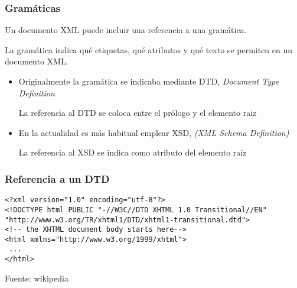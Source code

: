 \documentclass[ucs]{beamer}
\begin{document}
\begin{frame}[fragile]
\frametitle{Gramáticas}
Un documento XML puede incluir una referencia a una gramática.

La gramática indica qué etiquetas, qué atributos y qué texto se permiten
en un documento XML.
\begin{itemize}
\item
Originalmente la gramática se indicaba mediante
DTD, \emph{Document Type Definition}

La referencia al DTD se coloca entre el prólogo y el elemento raiz
\item
En la actualidad es más habitual emplear XSD, \emph{(XML Schema Definition)}

La referencia al XSD se indica como atributo del elemento raíz

\end{itemize}

\end{frame}


\begin{frame}[fragile]
\frametitle{Referencia a un DTD}

  \begin{footnotesize}
  \begin{verbatim}
<?xml version="1.0" encoding="utf-8"?>
<!DOCTYPE html PUBLIC "-//W3C//DTD XHTML 1.0 Transitional//EN"
"http://www.w3.org/TR/xhtml1/DTD/xhtml1-transitional.dtd">
<!-- the XHTML document body starts here-->
<html xmlns="http://www.w3.org/1999/xhtml">
 ...
</html>
  \end{verbatim}
  \end{footnotesize}

  \begin{scriptsize}
  \begin{flushright}
Fuente: wikipedia
  \end{flushright}
  \end{scriptsize}

\end{frame}
\end{document}
